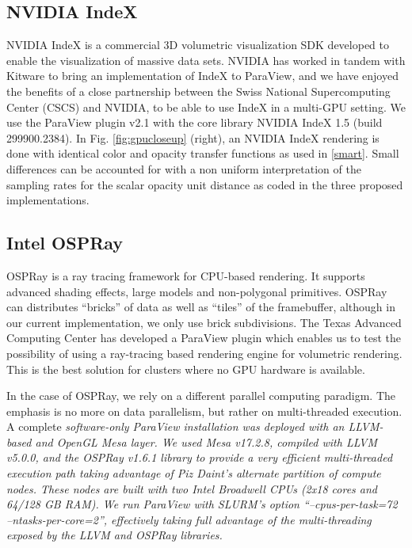 \documentclass[final,5p,times,twocolumn]{elsarticle}
\begin{document}
\subsection{NVIDIA IndeX} \label{index}

NVIDIA IndeX \cite{NVIDIAIndeX} is a commercial 3D volumetric visualization SDK developed to enable
the visualization of massive data sets. NVIDIA has worked in tandem with Kitware to
bring an implementation of IndeX to ParaView, and we have enjoyed the benefits
of a close partnership between the Swiss National Supercomputing Center (CSCS)
and NVIDIA, to be able to use IndeX in a multi-GPU setting. We use the ParaView
plugin v2.1 with the core library NVIDIA IndeX 1.5 (build 299900.2384). In
Fig. \ref{fig:gpucloseup} (right), an NVIDIA IndeX rendering is done with identical
color and opacity transfer functions as used in \ref{smart}.
Small differences can be accounted for with a non uniform interpretation of the sampling rates
for the scalar opacity unit distance as coded in the three proposed implementations.

\subsection{Intel OSPRay}

OSPRay \cite{OSPRay} is a ray tracing framework for CPU-based rendering. It supports advanced 
shading effects, large models and non-polygonal primitives. OSPRay can distributes 
``bricks'' of data as well as ``tiles'' of the framebuffer, although in our current
implementation, we only use brick subdivisions. The Texas Advanced Computing Center
has developed a ParaView plugin which enables us to test the possibility of
using a ray-tracing based rendering engine for volumetric rendering. This is
the best solution for clusters where no GPU hardware is available.

In the case of OSPRay, we rely on a different parallel computing paradigm.
The emphasis is no more on data parallelism, but rather on multi-threaded execution.
A complete \it{software-only} \rm ParaView installation was deployed with an LLVM-based and
OpenGL Mesa layer. We used Mesa v17.2.8, compiled with LLVM v5.0.0, and the
OSPRay v1.6.1 library to provide a very efficient multi-threaded execution path
taking advantage of Piz Daint's alternate partition of compute nodes. These nodes
are built with two Intel Broadwell CPUs (2x18 cores and 64/128 GB RAM). We run
ParaView with SLURM's option ``--cpus-per-task=72 --ntasks-per-core=2'', effectively
taking full advantage of the multi-threading exposed by the LLVM and OSPRay libraries. 
\end{document}
